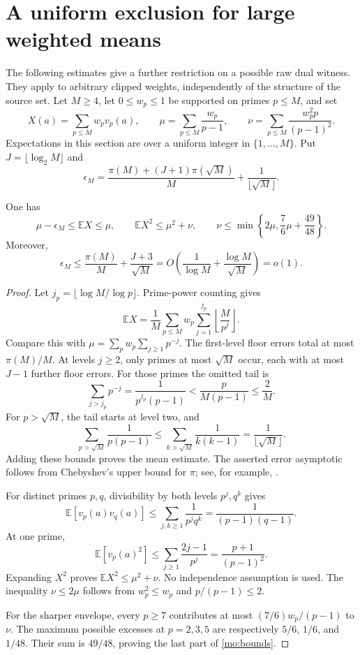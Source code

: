 \section{A uniform exclusion for large weighted means}
\label{mo:section}

The following estimates give a further restriction on a possible raw dual
witness. They apply to arbitrary clipped weights, independently of the
structure of the source set.
Let $M\ge4$, let $0\le w_p\le1$ be supported on primes $p\le M$, and set
\[
 X(a)=\sum_{p\le M}w_pv_p(a),\qquad
 \mu=\sum_{p\le M}\frac{w_p}{p-1},\qquad
 \nu=\sum_{p\le M}\frac{w_p^2p}{(p-1)^2}.
\]
Expectations in this section are over a uniform integer in $\{1,\ldots,M\}$.
Put $J=\lfloor\log_2M\rfloor$ and
\begin{equation}
 \epsilon_M=
 \frac{\pi(M)+(J+1)\pi(\sqrt M)}{M}
       +\frac1{\lfloor\sqrt M\rfloor}.
 \label{mo:error}
\end{equation}

\begin{lemma}
\label{mo:moments}
One has
\begin{equation}
 \mu-\epsilon_M\le \mathbb EX\le\mu,\qquad
 \mathbb EX^2\le\mu^2+\nu,\qquad
 \nu\le\min\left\{2\mu,\frac76\mu+\frac{49}{48}\right\}.
 \label{mo:bounds}
\end{equation}
Moreover,
\[
 \epsilon_M\le\frac{\pi(M)}M+\frac{J+3}{\sqrt M}
 =O\left(\frac1{\log M}+\frac{\log M}{\sqrt M}\right)=o(1).
\]
\end{lemma}

\begin{proof}
Let $j_p=\lfloor\log M/\log p\rfloor$. Prime-power counting gives
\[
 \mathbb EX=\frac1M\sum_{p\le M}w_p
                    \sum_{j=1}^{j_p}\left\lfloor\frac M{p^j}\right\rfloor.
\]
Compare this with $\mu=\sum_pw_p\sum_{j\ge1}p^{-j}$.
The first-level floor errors total at most $\pi(M)/M$.
At levels $j\ge2$, only primes at most $\sqrt M$ occur, each with
at most $J-1$ further floor errors. For those primes the omitted tail is
\[
 \sum_{j>j_p}p^{-j}
  =\frac1{p^{j_p}(p-1)}
  <\frac p{M(p-1)}\le\frac2M.
\]
For $p>\sqrt M$, the tail starts at level two, and
\[
 \sum_{p>\sqrt M}\frac1{p(p-1)}
 \le\sum_{k>\sqrt M}\frac1{k(k-1)}
 =\frac1{\lfloor\sqrt M\rfloor}.
\]
Adding these bounds proves the mean estimate. The asserted error
asymptotic follows from Chebyshev's upper bound for $\pi$;
see, for example, \cite{GranvilleSound}.

For distinct primes $p,q$, divisibility by both levels $p^j,q^k$ gives
\[
 \mathbb E[v_p(a)v_q(a)]
 \le\sum_{j,k\ge1}\frac1{p^jq^k}
 =\frac1{(p-1)(q-1)}.
\]
At one prime,
\[
 \mathbb E[v_p(a)^2]
 \le\sum_{j\ge1}\frac{2j-1}{p^j}
 =\frac{p+1}{(p-1)^2}.
\]
Expanding $X^2$ proves $\mathbb EX^2\le\mu^2+\nu$.
No independence assumption is used.
The inequality $\nu\le2\mu$ follows from $w_p^2\le w_p$ and
$p/(p-1)\le2$.

For the sharper envelope, every $p\ge7$ contributes at most
$(7/6)w_p/(p-1)$ to $\nu$. The maximum possible excesses at $p=2,3,5$
are respectively $5/6$, $1/6$, and $1/48$. Their sum is $49/48$,
proving the last part of \eqref{mo:bounds}.
\end{proof}


